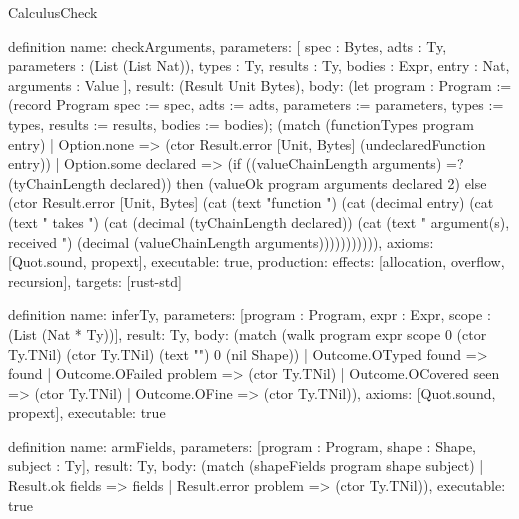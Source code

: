 \begin{lexlean}{CalculusCheck}
\begin{semanticmodule}
definition{
  name: checkArguments,
  parameters: [
    spec : Bytes,
    adts : Ty,
    parameters : (List (List Nat)),
    types : Ty,
    results : Ty,
    bodies : Expr,
    entry : Nat,
    arguments : Value
  ],
  result: (Result Unit Bytes),
  body: (let program : Program := (record Program {spec := spec, adts := adts, parameters := parameters, types := types, results := results, bodies := bodies}); (match (functionTypes program entry)
    | Option.none => (ctor Result.error [Unit, Bytes] (undeclaredFunction entry))
    | Option.some declared => (if ((valueChainLength arguments) =? (tyChainLength declared)) then (valueOk program arguments declared 2) else (ctor Result.error [Unit, Bytes] (cat (text "function ") (cat (decimal entry) (cat (text " takes ") (cat (decimal (tyChainLength declared)) (cat (text " argument(s), received ") (decimal (valueChainLength arguments))))))))))),
  axioms: [Quot.sound, propext],
  executable: true,
  production: {effects: [allocation, overflow, recursion], targets: [rust-std]}
}

definition{
  name: inferTy,
  parameters: [program : Program, expr : Expr, scope : (List (Nat * Ty))],
  result: Ty,
  body: (match (walk program expr scope 0 (ctor Ty.TNil) (ctor Ty.TNil) (text "") 0 (nil Shape))
    | Outcome.OTyped found => found
    | Outcome.OFailed problem => (ctor Ty.TNil)
    | Outcome.OCovered seen => (ctor Ty.TNil)
    | Outcome.OFine => (ctor Ty.TNil)),
  axioms: [Quot.sound, propext],
  executable: true
}

definition{
  name: armFields,
  parameters: [program : Program, shape : Shape, subject : Ty],
  result: Ty,
  body: (match (shapeFields program shape subject)
    | Result.ok fields => fields
    | Result.error problem => (ctor Ty.TNil)),
  executable: true
}


\end{semanticmodule}
\end{lexlean}
